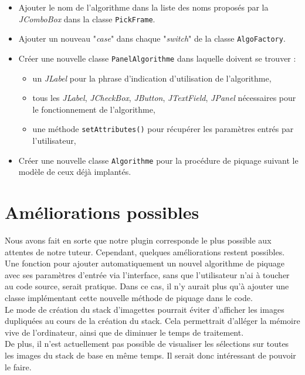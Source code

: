 \begin{itemize}
\item Ajouter le nom de l'algorithme dans la liste des noms proposés par la \emph{JComboBox} dans la classe \texttt{PickFrame}.
\item Ajouter un nouveau "\textit{case}" dans chaque "\textit{switch}" de la classe \texttt{AlgoFactory}.
\item Créer une nouvelle classe \texttt{PanelAlgorithme} dans laquelle doivent se trouver :
	\begin{itemize}
	\item un \emph{JLabel} pour la phrase d'indication d'utilisation de l'algorithme,
	\item tous les \emph{JLabel}, \emph{JCheckBox}, \emph{JButton}, \emph{JTextField}, \emph{JPanel} nécessaires pour le fonctionnement de l'algorithme,
	\item une méthode \texttt{setAttributes()} pour récupérer les paramètres entrés par l'utilisateur,
	\end{itemize}
\item Créer une nouvelle classe \texttt{Algorithme} pour la procédure de piquage suivant le modèle de ceux déjà implantés. 
\end{itemize}

\section{Améliorations possibles}

Nous avons fait en sorte que notre plugin corresponde le plus possible aux attentes de notre tuteur. Cependant, quelques améliorations restent possibles. \\

Une fonction pour ajouter automatiquement un nouvel algorithme de piquage avec ses paramètres d'entrée via l'interface, sans que l'utilisateur n'ai à toucher au code source, serait pratique. Dans ce cas, il n'y aurait plus qu'à ajouter une classe implémentant cette nouvelle méthode de piquage dans le code. \\

Le mode de création du stack d'imagettes pourrait éviter d'afficher les images dupliquées au cours de la création du stack. Cela permettrait d'alléger la mémoire vive de l'ordinateur, ainsi que de diminuer le temps de traitement. \\
De plus, il n'est actuellement pas possible de visualiser les sélections sur toutes les images du stack de base en même temps. Il serait donc intéressant de pouvoir le faire. \\

